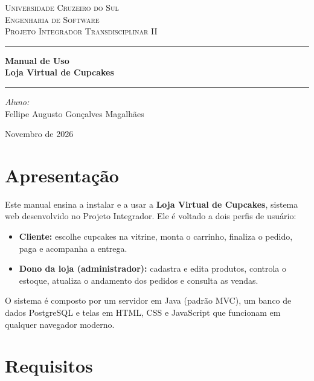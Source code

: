 \documentclass[12pt]{article}
\begin{document}
\begin{titlepage}
    \centering
    \textsc{\Large Universidade Cruzeiro do Sul}\\[0.5cm]
    \textsc{\Large Engenharia de Software}\\[0.5cm]
    \textsc{Projeto Integrador Transdisciplinar II}
    \vspace{2.5cm}

    \hrule \vspace{0.4cm}
    {\huge \bfseries Manual de Uso\\[0.3cm] Loja Virtual de Cupcakes}\\[0.4cm]
    \hrule
    \vspace{3cm}

    \begin{flushleft}
        \Large \emph{Aluno:}\\
        Fellipe Augusto Gonçalves Magalhães
    \end{flushleft}
    \vfill
    {\large Novembro de 2026}
\end{titlepage}

\tableofcontents
\newpage

\section{Apresentação}

Este manual ensina a instalar e a usar a \textbf{Loja Virtual de Cupcakes}, sistema web desenvolvido no Projeto Integrador. Ele é voltado a dois perfis de usuário:

\begin{itemize}
\item \textbf{Cliente:} escolhe cupcakes na vitrine, monta o carrinho, finaliza o pedido, paga e acompanha a entrega.
\item \textbf{Dono da loja (administrador):} cadastra e edita produtos, controla o estoque, atualiza o andamento dos pedidos e consulta as vendas.
\end{itemize}

O sistema é composto por um servidor em Java (padrão MVC), um banco de dados PostgreSQL e telas em HTML, CSS e JavaScript que funcionam em qualquer navegador moderno.

\section{Requisitos}
\end{document}

